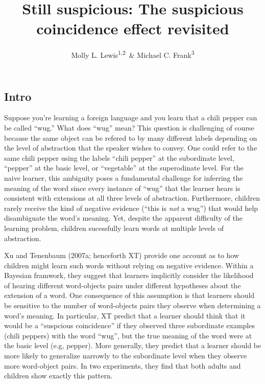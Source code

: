 \documentclass[english,floatsintext,man]{apa6}
\title{Still suspicious: The suspicious coincidence effect revisited}
\author{Molly L. Lewis\textsuperscript{1,2}~\& Michael C. Frank\textsuperscript{3}}
\affiliation{
    \vspace{0.5cm}
          \textsuperscript{1} Computation Institute, University of Chicago\\
          \textsuperscript{2} Department of Psychology, University of Wisconsin, Madison\\
          \textsuperscript{3} Department of Psychology, Stanford University  }
\theoremstyle{definition}
\theoremstyle{definition}
\theoremstyle{remark}
\begin{document}
\maketitle

\setcounter{secnumdepth}{0}



\subsection{Intro}\label{intro}

Suppose you're learning a foreign language and you learn that a chili
pepper can be called \enquote{wug.} What does \enquote{wug} mean? This
question is challenging of course because the same object can be refered
to by many different labels depending on the level of abstraction that
the speaker wishes to convey. One could refer to the same chili pepper
using the labels \enquote{chili pepper} at the subordinate level,
\enquote{pepper} at the basic level, or \enquote{vegetable} at the
superodinate level. For the naive learner, this ambiguity poses a
fundamental challenge for inferring the meaning of the word since every
instance of \enquote{wug} that the learner hears is consistent with
extensions at all three levels of abstraction. Furthermore, children
rarely receive the kind of negative evidence (\enquote{this is
\emph{not} a wug}) that would help disambiguate the word's meaning. Yet,
despite the apparent difficulty of the learning problem, children
sucessfully learn words at multiple levels of abstraction.

Xu and Tenenbaum (2007a; henceforth XT) provide one account as to how
children might learn such words without relying on negative evidence.
Within a Bayesian framwork, they suggest that learners implicitly
consider the likelihood of hearing different word-objects pairs under
different hypotheses about the extension of a word. One consequence of
this assumption is that learners should be sensitive to the number of
word-objects pairs they observe when determining a word's meaning. In
particular, XT predict that a learner should think that it would be a
\enquote{suspcious coincidence} if they observed three subordinate
examples (chili peppers) with the word \enquote{wug}, but the true
meaning of the word were at the basic level (e.g, pepper). More
generally, they predict that a learner should be more likely to
generalize narrowly to the subordinate level when they observe more
word-object pairs. In two experiments, they find that both adults and
children show exactly this pattern.
\end{document}
